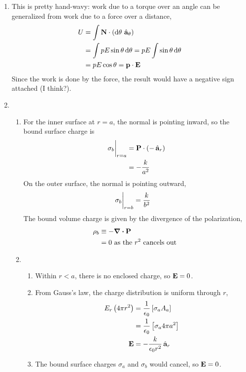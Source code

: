 \documentclass{homework}
\begin{document}
\begin{enumerate}
		\item This is pretty hand-wavy: work due to a torque over an angle can be generalized from work due to a force over a distance, \begin{align*}
			U & = \int \boldsymbol{\mathrm{N}} \cdot \left(\dd{\theta} \thinspace\hat{ \mathbf{a}}_{\theta}\right) \\
				& = \int p E \sin \theta \dd{\theta} = p E \int \sin \theta \dd{\theta} \\
				& = p E \cos \theta = \boldsymbol{\mathrm{p}} \cdot \boldsymbol{\mathrm{E}}
			\end{align*}
			Since the work is done by the force, the result would have a negative sign attached (I think?). 
		\item \begin{enumerate}
			\item For the inner surface at $r=a$, the normal is pointing inward, so the bound surface charge is \begin{align*}
				\eval{\sigma_b}_{r=a} & = \bvec{P} \cdot \left(-\uvec{r}\right) \\
					& = -\frac{k}{a^2}
			\end{align*}
			On the outer surface, the normal is pointing outward, \begin{align*}
				\eval{ \sigma_b}_{r=b} & = \frac{k}{b^2}
			\end{align*}
			The bound volume charge is given by the divergence of the polarization, \begin{align*}
				\rho_b & \equiv -\div{ \boldsymbol{\mathrm{P}} } \\
					& = 0 \text{ as the $r^2$ cancels out }
			\end{align*}
		
			\item \begin{enumerate}
				\item Within $r<a$, there is no enclosed charge, so $\boldsymbol{\mathrm{E}} = 0$.
				
				\item From Gauss's law, the charge distribution is uniform through $r$, \begin{align*} 
					E_r \left( 4 \pi r^2 \right) & = \frac{1}{\epsilon_0} \left[ \sigma_a A_a \right] \\
						& = \frac{1}{\epsilon_0} \left[ \sigma_a 4 \pi a^2 \right] \\
					\boldsymbol{\mathrm{E}} & = -\frac{k}{\epsilon_0 r^2} \thinspace\hat{ \mathbf{a}}_{r}
				\end{align*}
			
				\item The bound surface charges $\sigma_a$ and $\sigma_b$ would cancel, so $\boldsymbol{\mathrm{E}} = 0$.
			\end{enumerate}
		\end{enumerate}
	

\end{enumerate}
\end{document}
